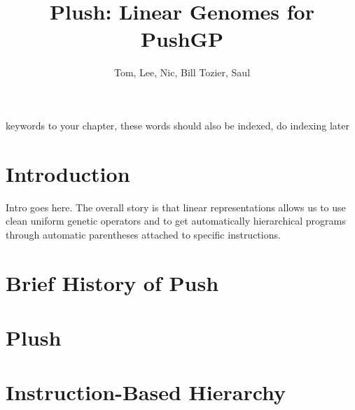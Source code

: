 %

\title*{Plush: Linear Genomes for PushGP}
\author{Tom, Lee, Nic, Bill Tozier, Saul}

\maketitle


\begin{keywords}
keywords to your chapter, these words should also be indexed, do indexing later
\end{keywords}

\section{Introduction}
\label{Introduction}

Intro goes here. The overall story is that linear representations allows us to use clean uniform genetic operators and to get automatically hierarchical programs through automatic parentheses attached to specific instructions.



\section{Brief History of Push}



\section{Plush}



\section{Instruction-Based Hierarchy}


